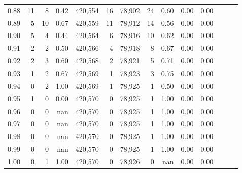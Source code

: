\begin{tabular}{rrrrrrrrrrrrrr}
0.88 &      11 &      8 &  0.42 &  420,554 &       16 &  78,902 &      24 &  0.60 &  0.00 &      0.00 \\
0.89 &       5 &     10 &  0.67 &  420,559 &       11 &  78,912 &      14 &  0.56 &  0.00 &      0.00 \\
0.90 &       5 &      4 &  0.44 &  420,564 &        6 &  78,916 &      10 &  0.62 &  0.00 &      0.00 \\
0.91 &       2 &      2 &  0.50 &  420,566 &        4 &  78,918 &       8 &  0.67 &  0.00 &      0.00 \\
0.92 &       2 &      3 &  0.60 &  420,568 &        2 &  78,921 &       5 &  0.71 &  0.00 &      0.00 \\
0.93 &       1 &      2 &  0.67 &  420,569 &        1 &  78,923 &       3 &  0.75 &  0.00 &      0.00 \\
0.94 &       0 &      2 &  1.00 &  420,569 &        1 &  78,925 &       1 &  0.50 &  0.00 &      0.00 \\
0.95 &       1 &      0 &  0.00 &  420,570 &        0 &  78,925 &       1 &  1.00 &  0.00 &      0.00 \\
0.96 &       0 &      0 &   nan &  420,570 &        0 &  78,925 &       1 &  1.00 &  0.00 &      0.00 \\
0.97 &       0 &      0 &   nan &  420,570 &        0 &  78,925 &       1 &  1.00 &  0.00 &      0.00 \\
0.98 &       0 &      0 &   nan &  420,570 &        0 &  78,925 &       1 &  1.00 &  0.00 &      0.00 \\
0.99 &       0 &      0 &   nan &  420,570 &        0 &  78,925 &       1 &  1.00 &  0.00 &      0.00 \\
1.00 &       0 &      1 &  1.00 &  420,570 &        0 &  78,926 &       0 &   nan &  0.00 &      0.00 \\
\bottomrule
\end{tabular}
